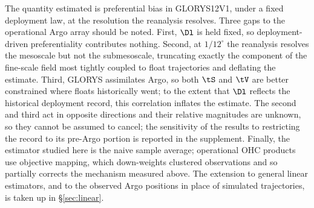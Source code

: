 The quantity estimated is preferential bias in GLORYS12V1, under a fixed
deployment law, at the resolution the reanalysis resolves. Three gaps to the
operational Argo array should be noted. First, $\Dl$ is held fixed, so
deployment-driven preferentiality contributes nothing. Second, at $1/12^\circ$
the reanalysis resolves the mesoscale but not the submesoscale, truncating
exactly the component of the fine-scale field most tightly coupled to float
trajectories and deflating the estimate. Third, GLORYS assimilates Argo, so both
$\tS$ and $\tV$ are better constrained where floats historically went; to the
extent that $\Dl$ reflects the historical deployment record, this correlation
inflates the estimate. The second and third act in opposite directions and their
relative magnitudes are unknown, so they cannot be assumed to cancel; the
sensitivity of the results to restricting the record to its pre-Argo portion is
reported in the supplement. Finally, the estimator studied here is the naive
sample average; operational OHC products use objective mapping, which
down-weights clustered observations and so partially corrects the mechanism
measured above. The extension to general linear estimators, and to the observed
Argo positions in place of simulated trajectories, is taken up in
\S\ref{sec:linear}.

